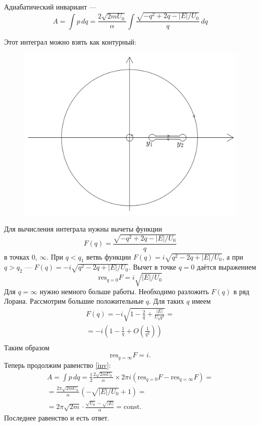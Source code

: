 \documentclass{article}
\begin{document}
	Адиабатический инвариант --- 
	\begin{equation}
		\label{inv}
		A = \int p\,dq = \frac{2\sqrt{2mU_0}}{\alpha} 
					\int\frac{\sqrt{-q^2 + 2q - |E|/U_0}}{q}\,dq
	\end{equation}

	Этот интеграл можно взять как контурный:
	\begin{figure}[h]
		\includegraphics[width=\linewidth]{contour.png}
	\end{figure}

	Для вычисления интеграла нужны вычеты функции
	\begin{equation}
		F(q) = \frac{\sqrt{-q^2 + 2q - |E|/U_0}}{q}
	\end{equation}
	в точках $0$, $\infty$.
	При $q < q_1$ ветвь  
	функции $F(q) = i\sqrt{q^2 - 2q + |E|/U_0}$,
	а при $q > q_2$ --- $F(q) = -i\sqrt{q^2 - 2q + |E|/U_0}$.
	Вычет в точке $q = 0$ даётся выражением 
	\begin{equation}
		\mathrm{res}_{q = 0} F = i\sqrt{|E|/U_0}
	\end{equation}
	Для $q = \infty$ нужно немного больше работы. Необходимо
	разложить $F(q)$ в ряд Лорана. Рассмотрим большие положительные  
	$q$. Для таких $q$ имеем
	\begin{multline}
		F(q) = -i\sqrt{1 - \frac{2}{q} + \frac{|E|}{U_0q^2}} = 
		\\ 
		= -i\left(1 - \frac{1}{q} + O\left(\frac{1}{q^2}\right)\right)
		\\	
	\end{multline}
	Таким образом
	\begin{equation}
		\mathrm{res}_{q = \infty} F = i.
	\end{equation}
	Теперь продолжим равенство \ref{inv}:
	\begin{multline}
			A = \int p\,dq = \frac{1}{2}\frac{2\sqrt{2mU_0}}{\alpha} 
				\times
				2\pi i (\mathrm{res}_{q = 0}F - \mathrm{res}_{q = \infty}F)=
				\\	
				= \frac{2\pi \sqrt{2mU_0}}{\alpha}(-\sqrt{|E|/U_0}+ 1) = 
				\\
				= 2\pi \sqrt{2m}\cdot\frac{\sqrt{U_0} - \sqrt{|E|}}{\alpha} = \mathrm{const}. 
	\end{multline}
	Последнее равенство и есть ответ.
\end{document}
